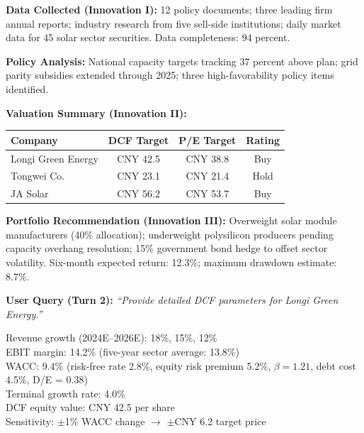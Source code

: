 \documentclass[12pt,letterpaper]{article}
\begin{document}
\begin{tcolorbox}[colback=light-gray,colframe=aaa-blue,
                  title={Frontiers in FinTech Analysis Output — Solar Industry},
                  fonttitle=\small\bfseries,
                  fontupper=\small\singlespacing,
                  breakable]
\textbf{Data Collected (Innovation I):} 12 policy documents; three
leading firm annual reports; industry research from five sell-side
institutions; daily market data for 45 solar sector securities.
Data completeness: 94 percent.

\medskip
\textbf{Policy Analysis:}
National capacity targets tracking 37 percent above plan;
grid parity subsidies extended through 2025; three high-favorability
policy items identified.

\medskip
\textbf{Valuation Summary (Innovation II):}\\[4pt]
\singlespacing
\begin{tabular}{@{}lccc@{}}
\toprule
\textbf{Company} & \textbf{DCF Target} & \textbf{P/E Target}
  & \textbf{Rating} \\
\midrule
Longi Green Energy & CNY 42.5 & CNY 38.8 & Buy  \\
Tongwei Co.        & CNY 23.1 & CNY 21.4 & Hold \\
JA Solar           & CNY 56.2 & CNY 53.7 & Buy  \\
\bottomrule
\end{tabular}

\medskip
\textbf{Portfolio Recommendation (Innovation III):}
Overweight solar module manufacturers (40\% allocation);
underweight polysilicon producers pending capacity overhang resolution;
15\% government bond hedge to offset sector volatility.
Six-month expected return: 12.3\%; maximum drawdown estimate: 8.7\%.
\end{tcolorbox}

\noindent\textbf{User Query (Turn 2):}
\textit{``Provide detailed DCF parameters for Longi Green Energy.''}

\begin{tcolorbox}[colback=light-gray,colframe=aaa-blue,
                  title={DCF Parameter Detail --- Longi Green Energy},
                  fonttitle=\small\bfseries,
                  fontupper=\small\singlespacing]
Revenue growth (2024E--2026E): 18\%, 15\%, 12\% \\
EBIT margin: 14.2\% (five-year sector average: 13.8\%) \\
WACC: 9.4\% (risk-free rate 2.8\%, equity risk premium 5.2\%,
  $\beta = 1.21$, debt cost 4.5\%, D/E = 0.38) \\
Terminal growth rate: 4.0\% \\
DCF equity value: CNY 42.5 per share \\
Sensitivity: $\pm$1\% WACC change $\rightarrow$ $\pm$CNY 6.2
  target price
\end{tcolorbox}
\end{document}
